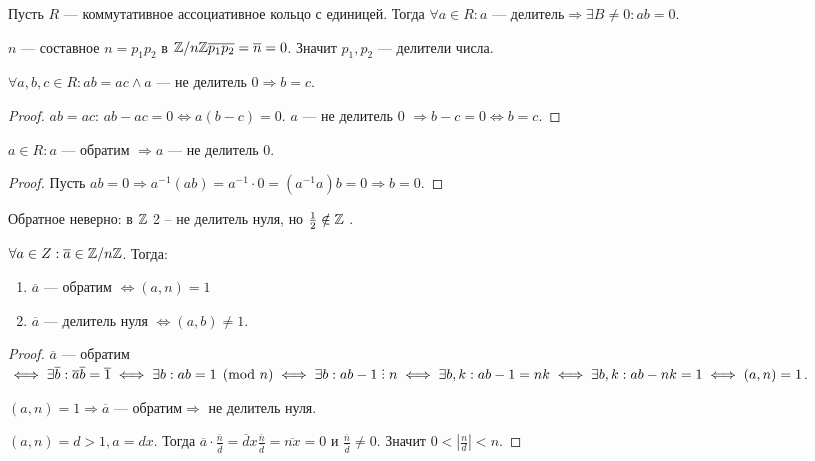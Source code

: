 \begin{definition}
    Пусть $R$ --- коммутативное ассоциативное кольцо с единицей. Тогда  $\forall a \in R: a\text{ --- делитель} \Rightarrow \exists B \neq 0: ab = 0$.
\end{definition}
\begin{example}
    $n$ --- составное  $n=p_1p_2$ в $\mathbb{Z} / n\mathbb{Z} \overline{p_1} \overline{p_2}=\overline{n}=0$. Значит $p_1,p_2$ --- делители числа.
\end{example}
\begin{lemma}
    $\forall a, b, c \in R\!: ab = ac \land a\text{ --- не делитель 0} \Rightarrow b = c$. 
\end{lemma}
\begin{proof}
    $ab=ac$:  $ab - ac = 0 \iff a(b-c) = 0$.  $a$ --- не делитель 0  $\Rightarrow b-c=0 \iff b = c$.
\end{proof}
\begin{lemma}
    $a \in R\!: a$ --- обратим $\Rightarrow a$ --- не делитель 0.
\end{lemma}
\begin{proof}
    Пусть $ab=0 \Rightarrow a^{-1}(ab) = a^{-1} \cdot 0 = (a^{-1}a)b = 0 \Rightarrow b =0$.
\end{proof}
\begin{remark}
    Обратное неверно: в $\mathbb{Z}$ 2 -- не делитель нуля, но  $\frac{1}{2} \notin \mathbb{Z}$ .
\end{remark}
\begin{theorem}
    $\forall a \in Z: \overline{a} \in \mathbb{Z} / n\mathbb{Z}$. Тогда:  
    \begin{enumerate}
        \item $\overline{a}$ --- обратим $\iff (a, n) = 1$
        \item  $\overline{a}$ --- делитель нуля $\iff (a, b) \neq 1$.
    \end{enumerate}
\end{theorem}
\begin{proof}
    $\overline{a}$ --- обратим  $\iff \exists \overline{b}: \overline{a}\overline{b} = \overline{1} \iff \exists b: ab = 1 \pmod{n} \iff \exists b: ab - 1 \divby n \iff \exists b, k: ab-1=nk \iff \exists b, k: ab-nk=1 \iff (a,n)  = 1$.

    $(a, n) = 1 \Rightarrow \overline{a}\text{ --- обратим} \Rightarrow$ не делитель нуля.

    $(a, n) = d > 1, a = dx$. Тогда  $\overline{a} \cdot \frac{\overline{n}}{\overline{d}} = \overline{d}x \frac{\overline{n}}{\overline{d}} = \overline{nx} = 0$ и $\frac{\overline{n}}{\overline{d}} \neq 0$. Значит  $0 < |\frac{n}{d}| < n$.
\end{proof}
